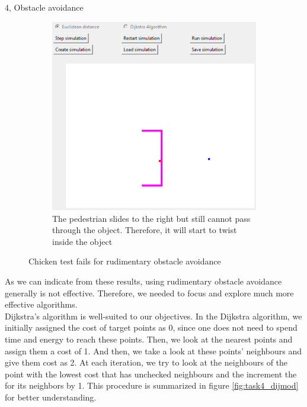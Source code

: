 \documentclass[10pt,a4paper]{article}
\begin{document}
\begin{task}{4, Obstacle avoidance}
\begin{figure}[H]
\begin{center}   
\begin{subfigure}{0.5\textwidth}
 \centering
 \includegraphics[width=1\textwidth]{images/task4_chicken_second_contact.png}
 \caption{The pedestrian slides to the right but still cannot pass through the object. Therefore, it will start to twist inside the object}

 \end{subfigure}
\end{center}
\caption{Chicken test fails for rudimentary obstacle avoidance}
 \label{fig:task4_eucchick}
\end{figure}

As we can indicate from these results, using rudimentary obstacle avoidance generally is not effective. Therefore, we needed to focus and explore much more effective algorithms. \\

Dijkstra's algorithm is well-suited to our objectives. In the Dijkstra algorithm, we initially assigned the cost of target points as 0, since one does not need to spend time and energy to reach these points. Then, we look at the nearest points and assign them a cost of 1. And then, we take a look at these points' neighbours and give them cost as 2. At each iteration, we try to look at the neighbours of the point with the lowest cost that has unchecked neighbours and the increment the for its neighbors by 1. This procedure is summarized in figure \ref{fig:task4_dijmod} for better understanding.\\


\end{task}
\end{document}

